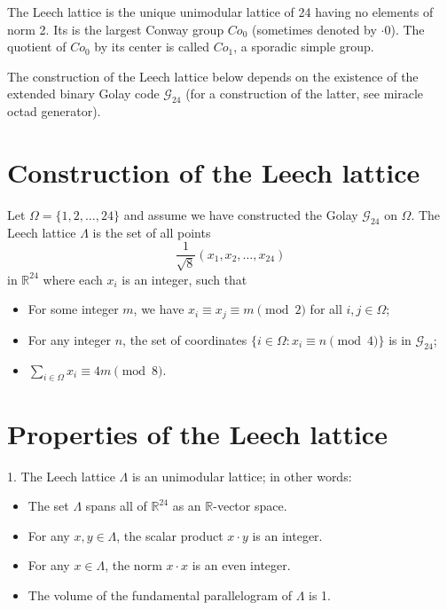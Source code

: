 \documentclass[12pt]{article}
\newcommand{\gc}{\mathcal{G}_{24}}
\begin{document}

The Leech lattice is the unique  unimodular lattice of  24 having no elements of norm 2.  Its  is the largest Conway group $Co_0$ (sometimes denoted by $\cdot 0$).  The quotient of $Co_0$ by its center is called $Co_1$, a sporadic simple group.  

The construction of the Leech lattice below depends on the existence of the extended binary Golay code $\gc$ (for a construction of the latter, see miracle octad generator).

\section{Construction of the Leech lattice}

Let $\Omega = \{1,2,\ldots,24\}$ and assume we have constructed the Golay  $\gc$ on $\Omega$.  The Leech lattice $\Lambda$ is the set of all points $$\frac{1}{\sqrt{8}}(x_1, x_2, \ldots, x_{24})$$ in $\mathbb{R}^{24}$ where each $x_i$ is an integer, such that
\begin{itemize}
\item{For some integer $m$, we have $x_i \equiv x_j \equiv m \pmod{2}$ for all $i, j \in \Omega$;}
\item{For any integer $n$, the set of coordinates $\{i \in \Omega: x_i \equiv n \pmod{4}\}$ is in $\gc$;}
\item{$\sum_{i \in\Omega} x_i \equiv 4m \pmod{8}$.}
\end{itemize}

\section{Properties of the Leech lattice}
1. The Leech lattice $\Lambda$ is an  unimodular lattice; in other words:
\begin{itemize}
\item{The set $\Lambda$ spans all of $\mathbb{R}^{24}$ as an $\mathbb{R}$-vector space.}
\item{For any $x,y \in \Lambda$, the scalar product $x \cdot y$ is an integer.}
\item{For any $x \in \Lambda$, the norm $x \cdot x$ is an even integer.}
\item{The volume of the fundamental parallelogram of $\Lambda$ is 1.}
\end{itemize}
\end{document}

